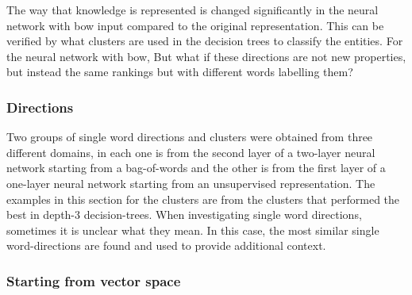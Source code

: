 






















The way that knowledge is represented is changed significantly in the neural network with bow input compared to the original representation. This can be verified by what clusters are used in the decision trees to classify the entities. For the neural network with bow, 
But what if these directions are not new properties, but instead the same rankings but with different words labelling them?






\subsubsection{Directions}

Two groups of single word directions and clusters were obtained from three different domains, in each one is from the second layer of  a two-layer neural network starting from a bag-of-words and the other is from the first layer of a one-layer neural network starting from an unsupervised representation. The examples in this section for the clusters are from the clusters that performed the best in depth-3 decision-trees. When investigating single word directions, sometimes it is unclear what they mean. In this case, the most similar single word-directions are found and used to provide additional context.







\subsubsection{Starting from vector space}

